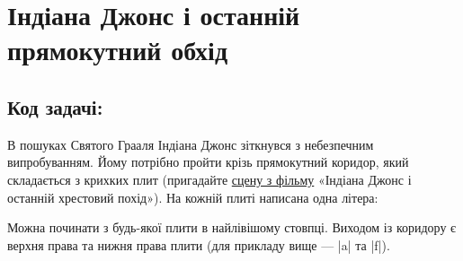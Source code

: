 \documentclass[12pt,a4paper]{article}
\begin{document}
\section*{Індіана Джонс і останній прямокутний обхід \hfill {}}


\subsection*{Код задачі: }

В пошуках Святого Грааля Індіана Джонс зіткнувся з небезпечним випробуванням.
Йому потрібно пройти крізь прямокутний коридор, який складається з крихких плит (пригадайте \href{https://www.youtube.com/watch?v=arMXzgiZsJQ}{\color{blue}сцену з фільму} «Індіана Джонс і останній хрестовий похід»).
На кожній плиті написана одна літера:

\begin{center}
\end{center}

Можна починати з будь-якої плити в найлівішому стовпці. Виходом із коридору є верхня права та нижня права плити (для прикладу вище --- |a| та |f|).
\end{document}
